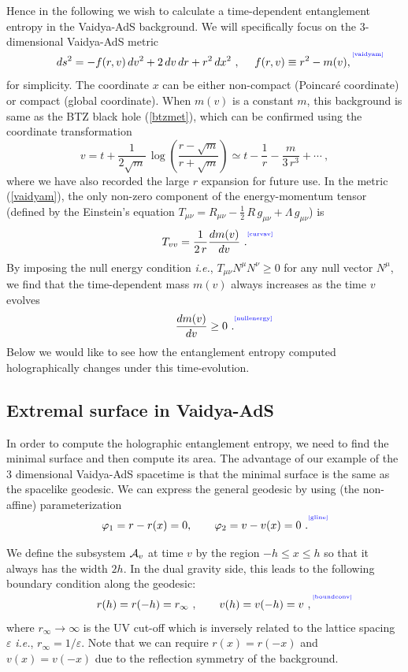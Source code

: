 \documentclass[12pt]{article}
\newcommand{\be}{\begin{equation}}
\newcommand{\ee}{\end{equation}}
\def\req#1{(\ref{#1})}
\def\ie{{\it i.e.}}
\def\veps{\varepsilon}
\def\vp{\varphi}
\def\s{\sigma}
\def\f#1#2{{\frac{#1}{#2}}}
\def\f#1#2{{\frac{#1}{#2}}}
\def\Label#1{\label{#1}%
{ \color{blue}{\smash{\hbox to0pt{\raise2ex\hbox{\tiny[#1]}\hss}}}}}
\def\cof{{\veps}}
\def\s{\sqrt}
\def\f {\frac}
\def\vp{\varphi}
\begin{document}
Hence in the following we wish to calculate a time-dependent entanglement entropy in
the Vaidya-AdS background. We will specifically focus on the 3-dimensional Vaidya-AdS  metric
%
\be  ds^2=-f(r,v)\, dv^2+2\, dv\,  dr+r^2 \, dx^2 \ ,\ \ \ \
f(r,v)\equiv r^2-m(v),
 \Label{vaidyam} \ee
%
for simplicity. The coordinate $x$ can be either non-compact (Poincar\'e coordinate) or compact (global coordinate). When $m(v)$ is a constant $m$, this
background is same as the BTZ black hole \req{btzmet}, which can be confirmed using the coordinate transformation
%
\be
v=t+\f{1}{2\s{m}}\, \log\left(\f{r-\s{m}}{r+\s{m}}\right)\simeq
t-\f{1}{r}-\f{m}{3\, r^3}+\cdots \ ,\ee
%
where we have also recorded the large $r$ expansion for future use. In the metric \req{vaidyam}, the only  non-zero component of the energy-momentum tensor (defined by the Einstein's equation $T_{\mu \nu}= R_{\mu \nu} -\frac{1}{2} \, R \, g_{\mu\nu} + \Lambda \, g_{\mu \nu}$) is
%
\be T_{vv}=\f{1}{2\,r}\f{dm(v)}{dv}\ .
\Label{curvav} \ee
%
By imposing the null energy condition \ie, $T_{\mu\nu}N^\mu
N^\nu\geq 0$ for any null vector $N^\mu$, we find that the time-dependent mass $m(v)$
always increases as the time $v$ evolves
%
\be \f{dm(v)}{dv}\geq
0 \ .\Label{nullenergy}\ee
%
Below we would like to see how the entanglement entropy computed
holographically changes under this time-evolution.

\subsection{Extremal surface in Vaidya-AdS}
In order to compute the holographic entanglement entropy, we need to
find the minimal surface and then compute its area. The advantage of
our example of the 3 dimensional Vaidya-AdS  spacetime is that the
minimal surface is the same as the spacelike geodesic. We can
express the general geodesic by using (the non-affine)
parameterization
%
 \be \vp_1=r-r(x)=0,\qquad  \vp_2=v-v(x)=0 \ .
\Label{gline} \ee
%

We define the subsystem ${\cal A}_v$ at time $v$ by the region
$-h\leq x\leq h$ so that it always has the width $2h$. In the dual
gravity side, this leads to the following boundary condition along the
geodesic:
%
\be r(h)=r(-h)=r_{\infty}\ ,\qquad v(h)=v(-h)=v \ ,
\Label{boundconv} \ee
%
where $r_{\infty}\to\infty $ is the UV cut-off which is inversely related to the lattice spacing $\cof$ \ie, $r_{\infty}=1/\cof$. Note that we can require $r(x)=r(-x)$ and $v(x)=v(-x)$ due to the reflection symmetry of the background.
\end{document}
